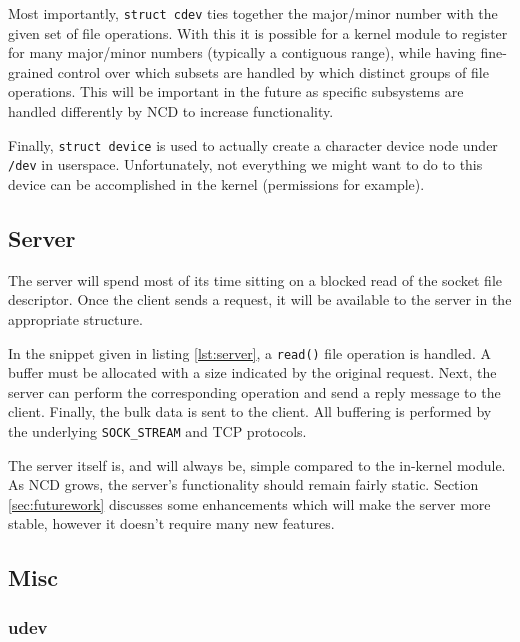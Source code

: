 \documentclass[11pt,twocolumn]{article}
\begin{document}
Most importantly, \texttt{struct cdev} ties together the major/minor
number with the given set of file operations. With this it is possible
for a kernel module to register for many major/minor numbers (typically
a contiguous range), while having fine-grained control over which
subsets are handled by which distinct groups of file operations. This
will be important in the future as specific subsystems are handled
differently by NCD to increase functionality.

Finally, \texttt{struct device} is used to actually create a character
device node under \texttt{/dev} in userspace. Unfortunately, not
everything we might want to do to this device can be accomplished in the
kernel (permissions for example).

\subsection{Server}



The server will spend most of its time sitting on a blocked read of the
socket file descriptor. Once the client sends a request, it will be
available to the server in the appropriate structure.

In the snippet given in listing \ref{lst:server}, a \texttt{read()} file
operation is handled. A buffer must be allocated with a size
indicated by the original request. Next, the server can perform the
corresponding operation and send a reply message to the client. Finally,
the bulk data is sent to the client. All buffering is performed by the
underlying \texttt{SOCK\_STREAM} and TCP protocols.

The server itself is, and will always be, simple compared to the
in-kernel module. As NCD grows, the server's functionality should remain
fairly static. Section \ref{sec:futurework} discusses some enhancements
which will make the server more stable, however it doesn't require many
new features.

\subsection{Misc}

\subsubsection{udev}
\label{subsec:udev}
\end{document}
